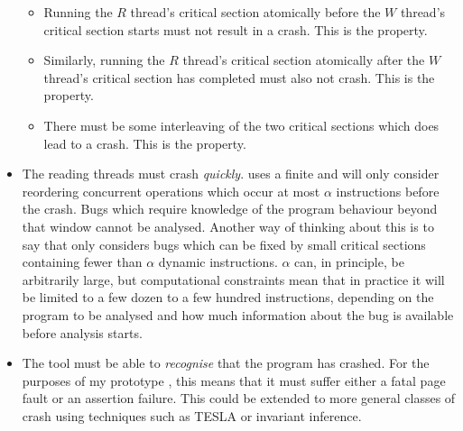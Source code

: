 \begin{itemize}
  \begin{itemize}
  \item Running the $R$ thread's critical section atomically before
    the $W$ thread's critical section starts must not result in a
    crash.  This is the  property.
  \item Similarly, running the $R$ thread's critical section
    atomically after the $W$ thread's critical section has completed
    must also not crash.  This is the 
    property.
  \item There must be some interleaving of the two critical sections
    which does lead to a crash.  This is the  property.
  \end{itemize}
\item The reading threads must crash \emph{quickly}.  {\Technique}
  uses a finite  \introduction{$\alpha$}
  and will only consider reordering concurrent operations which occur
  at most $\alpha$ instructions before the crash.  Bugs which require
  knowledge of the program behaviour beyond that window cannot be
  analysed.  Another way of thinking about this is to say that
  {\technique} only considers bugs which can be fixed by small
  critical sections containing fewer than $\alpha$ dynamic
  instructions.  $\alpha$ can, in principle, be arbitrarily large, but
  computational constraints mean that in practice it will be limited
  to a few dozen to a few hundred instructions, depending on the
  program to be analysed and how much information about the bug is
  available before analysis starts.
\item The tool must be able to \emph{recognise}
  that the program has crashed.  For the purposes of my prototype
  {\implementation}, this means that it must suffer either a fatal
  page fault or an assertion failure.  This could be extended to more
  general classes of crash using techniques such as TESLA\needCite{}
  or invariant inference\needCite{}.

    

\end{itemize}

